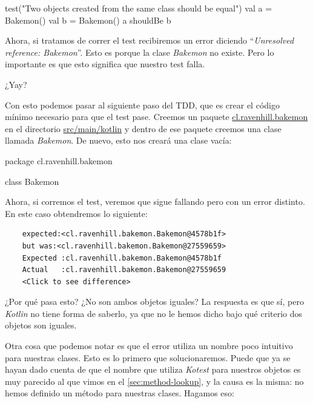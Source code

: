  \begin{kotlin}
    test("Two objects created from the same class should be equal") {
      val a = Bakemon()
      val b = Bakemon()
      a shouldBe b
    }
  \end{kotlin}

  Ahora, si tratamos de correr el test recibiremos un error diciendo 
  \enquote{\textit{Unresolved reference: Bakemon}}.
  Esto es porque la clase \textit{Bakemon} no existe.
  Pero lo importante es que esto significa que nuestro test falla.

  \begin{center}
    ¿Yay?
  \end{center}

  Con esto podemos pasar al siguiente paso del TDD, que es crear el código mínimo necesario para que
  el test pase.
  Creemos un paquete \url{cl.ravenhill.bakemon} en el directorio \url{src/main/kotlin} y dentro de
  ese paquete creemos una clase llamada \textit{Bakemon}.
  De nuevo, esto nos creará una clase vacía:

  \begin{kotlin}
    package cl.ravenhill.bakemon

    class Bakemon {
    }
  \end{kotlin}

  Ahora, si corremos el test, veremos que sigue fallando pero con un error distinto.
  En este caso obtendremos lo siguiente:

  \begin{verbatim}
    expected:<cl.ravenhill.bakemon.Bakemon@4578b1f> 
    but was:<cl.ravenhill.bakemon.Bakemon@27559659>
    Expected :cl.ravenhill.bakemon.Bakemon@4578b1f
    Actual   :cl.ravenhill.bakemon.Bakemon@27559659
    <Click to see difference>
  \end{verbatim}
  
  ¿Por qué pasa esto?
  ¿No son ambos objetos iguales?
  La respuesta es que sí, pero \textit{Kotlin} no tiene forma de saberlo, ya que no le hemos dicho
  bajo qué criterio dos objetos son iguales.

  Otra cosa que podemos notar es que el error utiliza un nombre poco intuitivo para nuestras clases.
  Esto es lo primero que solucionaremos.
  Puede que ya se hayan dado cuenta de que el nombre que utiliza \textit{Kotest} para nuestros 
  objetos es muy parecido al que vimos en el \cref{sec:method-lookup}, y la causa es la misma: no
  hemos definido un método  para nuestras clases.
  Hagamos eso:

